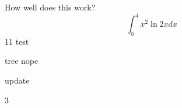 \documentclass{article}
\begin{document}
How well does this work?
$$\int_0^4 x^2 \ln{2x}dx$$
11  test

tree nope


update

3
\end{document}
